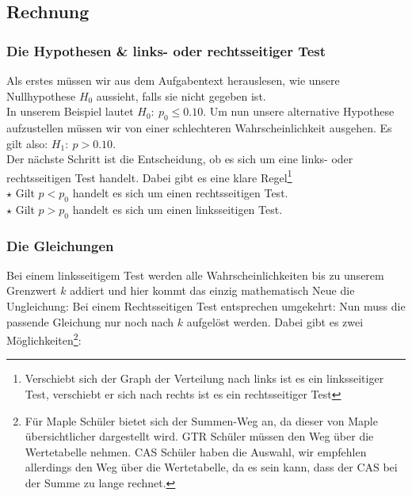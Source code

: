 \subsection{Rechnung}
	\subsubsection{Die Hypothesen \& links- oder rechtsseitiger Test}
		Als erstes müssen wir aus dem Aufgabentext herauslesen, wie unsere
		Nullhypothese \(H_0\) aussieht, falls sie nicht gegeben ist.\\
		In unserem Beispiel lautet \(H_0:\ p_0\leq 0.10\). Um nun unsere alternative
		Hypothese aufzustellen müssen wir von einer schlechteren Wahrscheinlichkeit
		ausgehen. Es gilt also: \(H_1:\ p>0.10\).\\
		Der nächste Schritt ist die Entscheidung, ob es sich um eine links- oder
		rechtsseitigen Test handelt. Dabei gibt es eine klare
		Regel\footnote{Verschiebt sich der Graph der Verteilung nach links ist es ein
		linksseitiger Test, verschiebt er sich nach rechts ist es ein rechtsseitiger
		Test}\\
		\(\star\) Gilt \(p<p_0\) handelt es sich um einen rechtsseitigen Test.\\
		\(\star\) Gilt \(p>p_0\) handelt es sich um einen linksseitigen Test.\\
	
	\subsubsection{Die Gleichungen}
		Bei einem linksseitigem Test werden alle Wahrscheinlichkeiten bis zu unserem
		Grenzwert \(k\) addiert und hier kommt das einzig mathematisch Neue die
		Ungleichung:
		\formel{\[P(X\geq k)=B(n,p_0,0)+B(n,p_0,1)+\ldots+B(n,p_0,k) \leq \alpha\]}
		Bei einem Rechtsseitigen Test entsprechen umgekehrt:
		\formel{\[P(X\leq k)=B(n,p_0,k)+B(n,p_0,k+1)+\ldots+B(n,p_0,n) \leq \alpha\]}
		Nun muss die passende Gleichung nur noch nach \(k\) aufgelöst werden. Dabei
		gibt es zwei Möglichkeiten\footnote{Für Maple Schüler bietet sich der Summen-Weg
		an, da dieser von Maple übersichtlicher dargestellt wird. GTR Schüler müssen
		den Weg über die Wertetabelle nehmen. CAS Schüler haben die Auswahl, wir
		empfehlen allerdings den Weg über die Wertetabelle, da es sein kann, dass der
		CAS bei der Summe zu lange rechnet.}:\\

